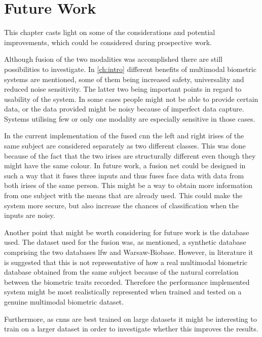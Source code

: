 \chapter{Future Work}
\label{ch:future_work}
This chapter casts light on some of the considerations and potential improvements, which could be considered during prospective work. 

Although fusion of the two modalities was accomplished there are still possibilities to investigate. 
In \autoref{ch:intro} different benefits of multimodal biometric systems are mentioned, some of them being increased safety, universality and reduced noise sensitivity. The latter two being important points in regard to usability of the system. In some cases people might not be able to provide certain data, or the data provided might be noisy because of imperfect data capture. Systems utilising few or only one modality are especially sensitive in those cases. 

In the current implementation of the fused \gls{cnn} the left and right irises of the same subject are considered separately as two different classes. This was done because of the fact that the two irises are structurally different even though they might have the same colour. In future work, a fusion net could be designed in such a way that it fuses three inputs and thus fuses face data with data from both irises of the same person. This might be a way to obtain more information from one subject with the means that are already used. This could make the system more secure, but also increase the chances of classification when the inputs are noisy. 

Another point that might be worth considering for future work is the database used. The dataset used for the fusion was, as mentioned, a synthetic database comprising the two databases \gls{lfw} and Warsaw-Biobase. However, in literature it is suggested that this is not representative of how a real multimodal biometric database obtained from the same subject because of the natural correlation between the biometric traits recorded. Therefore the performance implemented system might be most realistically represented when trained and tested on a genuine multimodal biometric dataset. 

Furthermore, as \gls{cnn}s are best trained on large datasets it might be interesting to train on a larger dataset in order to investigate whether this improves the results. 


